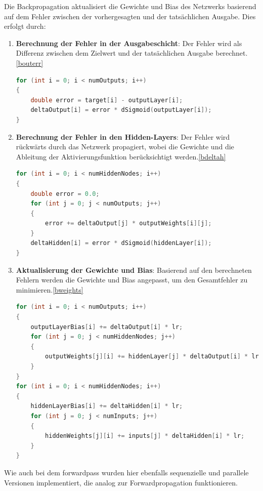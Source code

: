 \documentclass[a4paper, 12pt]{article}
\begin{document}
Die Backpropagation aktualisiert die Gewichte und Bias des Netzwerks basierend auf dem Fehler zwischen der vorhergesagten und der tatsächlichen Ausgabe.
Dies erfolgt durch:

\begin{enumerate}
    \item \textbf{Berechnung der Fehler in der Ausgabeschicht}: Der Fehler wird als Differenz zwischen dem Zielwert und der tatsächlichen Ausgabe berechnet.\ref{bouterr}
    \begin{lstlisting}[language=C, caption={backpropagation outputerr}, label={bouterr}]
for (int i = 0; i < numOutputs; i++)
{
    double error = target[i] - outputLayer[i];
    deltaOutput[i] = error * dSigmoid(outputLayer[i]);
}
    \end{lstlisting}
    
    \item \textbf{Berechnung der Fehler in den Hidden-Layers}: Der Fehler wird rückwärts durch das Netzwerk propagiert, wobei die Gewichte und die Ableitung der Aktivierungsfunktion berücksichtigt werden.\ref{bdeltah}
    \begin{lstlisting}[language=C, caption={backpropagation deltaHidden}, label={bdeltah}]
for (int i = 0; i < numHiddenNodes; i++)
{
    double error = 0.0;
    for (int j = 0; j < numOutputs; j++)
    {
        error += deltaOutput[j] * outputWeights[i][j];
    }
    deltaHidden[i] = error * dSigmoid(hiddenLayer[i]);
}
    \end{lstlisting}

    \item \textbf{Aktualisierung der Gewichte und Bias}: Basierend auf den berechneten Fehlern werden die Gewichte und Bias angepasst, um den Gesamtfehler zu minimieren.\ref{bweights}
    \begin{lstlisting}[language=C, caption={backpropagation weights}, label={bweights}]
for (int i = 0; i < numOutputs; i++)
{
    outputLayerBias[i] += deltaOutput[i] * lr;
    for (int j = 0; j < numHiddenNodes; j++)
    {
        outputWeights[j][i] += hiddenLayer[j] * deltaOutput[i] * lr;
    }
}
for (int i = 0; i < numHiddenNodes; i++)
{
    hiddenLayerBias[i] += deltaHidden[i] * lr;
    for (int j = 0; j < numInputs; j++)
    {
        hiddenWeights[j][i] += inputs[j] * deltaHidden[i] * lr;
    }
}
    \end{lstlisting}

\end{enumerate}

Wie auch bei dem forwardpass wurden hier ebenfalls sequenzielle und parallele Versionen 
implementiert, die analog zur Forwardpropagation funktionieren.
\end{document}
